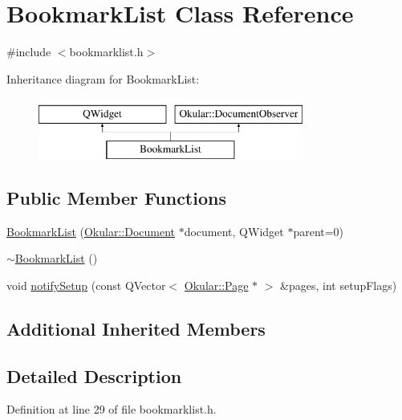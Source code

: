 \hypertarget{classBookmarkList}{\section{Bookmark\+List Class Reference}
\label{classBookmarkList}
}


{\ttfamily \#include $<$bookmarklist.\+h$>$}

Inheritance diagram for Bookmark\+List\+:\begin{figure}[H]
\begin{center}
\leavevmode
\includegraphics[height=2.000000cm]{classBookmarkList}
\end{center}
\end{figure}
\subsection*{Public Member Functions}
\begin{DoxyCompactItemize}
\item 
\hyperlink{classBookmarkList_a385d297ecec7bca083ab6753901c77bf}{Bookmark\+List} (\hyperlink{classOkular_1_1Document}{Okular\+::\+Document} $\ast$document, Q\+Widget $\ast$parent=0)
\item 
\hyperlink{classBookmarkList_af6e9171a2af0628aec8c35d22e092e2f}{$\sim$\+Bookmark\+List} ()
\item 
void \hyperlink{classBookmarkList_ab0802e3729078b77e9fb372e267d3d70}{notify\+Setup} (const Q\+Vector$<$ \hyperlink{classOkular_1_1Page}{Okular\+::\+Page} $\ast$ $>$ \&pages, int setup\+Flags)
\end{DoxyCompactItemize}
\subsection*{Additional Inherited Members}


\subsection{Detailed Description}


Definition at line 29 of file bookmarklist.\+h.




